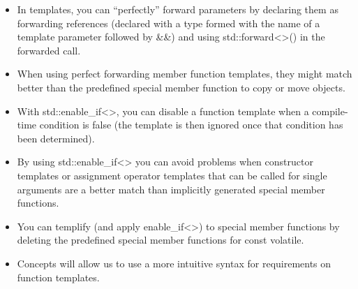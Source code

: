 
\begin{itemize}
\item 
In templates, you can “perfectly” forward parameters by declaring them as forwarding references (declared with a type formed with the name of a template parameter followed by \&\&) and using std::forward<>() in the forwarded call.

\item 
When using perfect forwarding member function templates, they might match better than the predefined special member function to copy or move objects.

\item 
With std::enable\_if<>, you can disable a function template when a compile-time condition is false (the template is then ignored once that condition has been determined).

\item 
By using std::enable\_if<> you can avoid problems when constructor templates or assignment operator templates that can be called for single arguments are a better match than implicitly generated special member functions.

\item 
You can templify (and apply enable\_if<>) to special member functions by deleting the predefined special member functions for const volatile.

\item 
Concepts will allow us to use a more intuitive syntax for requirements on function templates.
\end{itemize}
